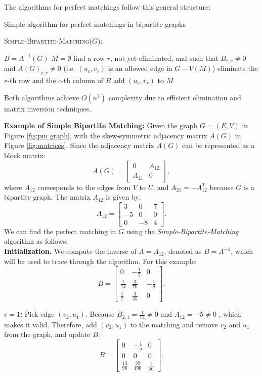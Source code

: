 The algorithms for perfect matchings follow this general structure:
\begin{algorithm}
\caption{Simple algorithm for perfect matchings in bipartite graphs}
\textsc{Simple-Bipartite-Matching}($G$):
\begin{algorithmic}[1]
    \STATE $B = A^{-1}(G)$
    \STATE $M = \emptyset$
        \STATE find a row $r$, not yet eliminated, and such that $B_{r,c} \neq 0$ and $A(G)_{c,r} \neq 0$ (i.e. $(u_c, v_r)$ is an allowed edge in $G - V(M)$)
        \STATE eliminate the $r$-th row and the $c$-th column of $B$
        \STATE add $(u_c, v_r)$ to $M$
    \ENDFOR
\end{algorithmic}
\end{algorithm}

Both algorithms achieve \( O(n^3) \) complexity due to efficient elimination and matrix inversion techniques.

\noindent \textbf{Example of Simple Bipartite Matching:} Given the graph $G=(E,V)$ in Figure \ref{fig:pm graph}, with the skew-symmetric adjacency matrix $A(G)$ in Figure \ref{fig:matrices}. Since the adjacency matrix \( A(G) \) can be represented as a block matrix:
\[
A(G) = 
\begin{bmatrix}
0 & A_{12} \\
A_{21} & 0
\end{bmatrix},
\]
where \( A_{12} \) corresponds to the edges from \( V \) to \( U \), and \( A_{21} = -A_{12}^T \) because $G$ is a bipartite graph. The matrix \( A_{12} \) is given by:
\[
A_{12} =
\begin{bmatrix}
3 & 0 & 7 \\
-5 & 0 & 0 \\
0 & -8 & 4
\end{bmatrix}.
\]
We can find the perfect matching in $G$ using the \textit{Simple-Bipartite-Matching} algorithm as follows:\\
\textbf{Initialization.} We compute the inverse of \( A = A_{12} \), denoted as \( B = A^{-1} \), which will be used to trace through the algorithm. For this example:
\[
\renewcommand{\arraystretch}{1.5}
B =
\begin{bmatrix}
0 & -\frac{1}{5} & 0 \\
\frac{1}{14} & \frac{3}{70} & -\frac{1}{8} \\
\frac{1}{7} & \frac{3}{35} & 0
\end{bmatrix}.
\]

\textbf{$c=1$: } Pick edge \( (v_2, u_1) \). Because \( B_{2,1} = \frac{1}{14} \neq 0 \) and \(A_{12} = -5 \neq 0 \) , which makes it valid. Therefore, add \( (v_2, u_1) \) to the matching and remove \( v_2 \) and \( u_1 \) from the graph, and update \( B \):
\[
\renewcommand{\arraystretch}{1.5}
B =
\begin{bmatrix}
0 & -\frac{1}{5} & 0 \\
0 & 0 & 0 \\
\frac{13}{98} & \frac{39}{490} & \frac{1}{56}
\end{bmatrix}.
\]

